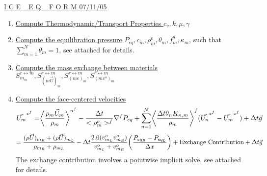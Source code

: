 \documentclass[fleqn]{article}
\newcommand{\SUM}[1]    {\ensuremath{\sum \limits_{{#1}=1}^N }}
\newcommand{\bigS}[1]   {\ensuremath{S^{r \leftrightarrow m}_{#1}}  }
\newcommand{\B}[1]      {\biggr{#1}}
\newcommand{\U}         {{\vec{U}}}
\newcommand{\rhoM}      {\ensuremath{\rho^{o}_m}}
\newcommand{\delt}      {\ensuremath{\Delta{t}} }
\newcommand{\f}         {\ensuremath{f^{\theta}_m} }
\newcommand{\sv}[1]     {\ensuremath{v^o_{m_{#1}} }}
\begin{document}
\setlength{\abovedisplayskip}{0.1in}
\setlength{\mathindent}{0.0in}
\underline{ I C E  ~ E Q ~  F O R M  \hspace{ 0.5in}07/11/05}

\begin{enumerate}
\item \underline{Compute Thermodynamic/Transport Properties
$c_v, k, \mu, \gamma$}

\item \underline{Compute the equilibration pressure}
$P_{eq}, c_m, \rhoM, \theta_m, \f, \kappa_m$, such that $\SUM{m}\theta_m = 1$, see attached for details.

\item \underline{Compute the mass exchange between materials}
$  \bigS{m_m},  \bigS{(m \U)_m}, \bigS{(m e)_m}, \bigS{(m v^o)_m }$

\item \underline{Compute the face-centered velocities} 
\[
    \vec{U_m}^{*^{f}} 
    = \B{<} \frac{ \rho_m \U_m }{\rho_m} \B{>}^{n^{f}}
%
    - \frac{ \delt }{< \rhoM >^f} \nabla^{f} P_{eq}
    + \SUM{n} \B{<} \frac{\delt \theta_n K_{n,m}}{\rho_m} \biggl{>}^f(\vec{U_n}^{*^{f}} - \vec{U_m}^{*^{f}})  
    + \delt\vec{g}
\]
\[    
   =\frac{(\rho \U)_{m_R} + (\rho \U)_{m_L}}{\rho_{m_R} + \rho_{m_L}}
%
   -\delt \frac{2.0 (\sv{L} \sv{R})}  {\sv{L} + \sv{R}}  \B{(} \frac{P_{eq_R} - P_{eq_L}}{\Delta x}\B{)}
   + \text{Exchange Contribution}
   + \delt\vec{g}
\]
The exchange contribution involves a pointwise implicit solve, see attached for details.


\end{enumerate}
\end{document}
